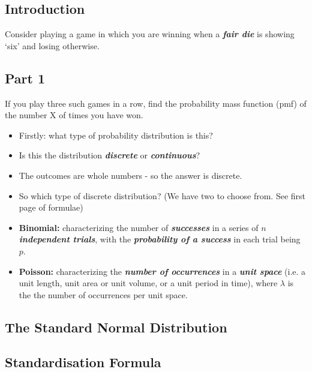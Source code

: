 \documentclass[12pt]{report}
\begin{document}
\subsection*{Introduction}{\LARGE Consider playing a game in which you are winning when a \textbf{\emph{fair die}} is showing `six'
	and losing otherwise.}
\subsection*{Part 1}{\LARGE If you play three such games in a row, find the probability mass function (pmf) of the number
	X of times you have won.}

{\LARGE
	\begin{itemize}
		\item Firstly: what type of probability distribution is this?
		
		\item Is this the distribution \textbf{\emph{discrete}} or  \textbf{\emph{continuous}}?
		
		\item The outcomes are whole numbers - so the answer is discrete.
		
		\item So which type of discrete distribution? (We have two to choose from. See first page of formulae)
		
		
		\item \textbf{Binomial:} characterizing the number of \textbf{\emph{successes}} in a series of \textbf{\emph{$n$ independent trials}}, with the \textbf{\emph{probability of a success}} in each trial being $p$.
		
		\item \textbf{Poisson:}  characterizing the \textbf{\emph{number of occurrences}} in a \textbf{\emph{unit space}} (i.e. a unit length, unit area or unit volume, or a unit period in time), where $\lambda$ is the the number of occurrences per unit space.
		
	\end{itemize}
}

\subsection{The Standard Normal Distribution}



\subsection{Standardisation Formula}
\end{document}
